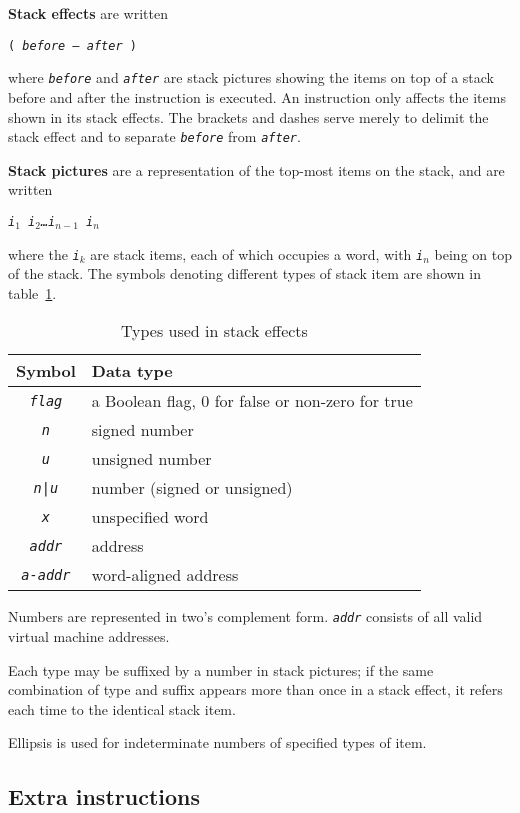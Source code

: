 \documentclass[a4paper]{article}
\newcommand{\spic}[1]{\texttt{\textsl{#1\/}}}
\begin{document}
{\bf Stack effects} are written

\centerline{\tt ( \spic{before — after} )}

\noindent where \spic{before} and \spic{after} are stack pictures showing the items on top
of a stack before and after the instruction is executed.
An instruction only affects the items shown in its
stack effects. The brackets and dashes serve merely to delimit the stack
effect and to separate \spic{before} from \spic{after}.

{\bf Stack pictures}
are a representation of the top-most items on the stack, and are written

\centerline{\spic{i$_1$ i$_2$\dots i$_{n-1}$ i$_n$}}

\noindent where the \spic{i$_k$} are stack items, each of which occupies a word, with \spic{i$_n$} being on top of the stack. The symbols denoting different types of stack item are shown in table~\ref{typetable}.

\begin{table}[htbp]
\begin{center}
\begin{tabular}{cl} \toprule
\bf Symbol & \bf Data type \\ \midrule
\spic{flag} & a Boolean flag, $0$ for false or non-zero for true \\
\spic{n} & signed number \\
\spic{u} & unsigned number \\
\spic{n{\tt |}u} & number (signed or unsigned) \\
\spic{x} & unspecified word \\
\spic{addr} & address \\
\spic{a-addr} & word-aligned address \\
\bottomrule
\end{tabular}
\caption{\label{typetable}Types used in stack effects}
\end{center}
\end{table}

Numbers are represented in two's complement form. \spic{addr} consists of all
valid virtual machine addresses.

Each type may be suffixed by a number in stack pictures; if the same combination
of type and suffix appears more than once in a stack effect, it refers each time to the identical stack item.

Ellipsis is used for indeterminate numbers of specified types of item.


\subsection{Extra instructions}
\label{extra}
\end{document}
